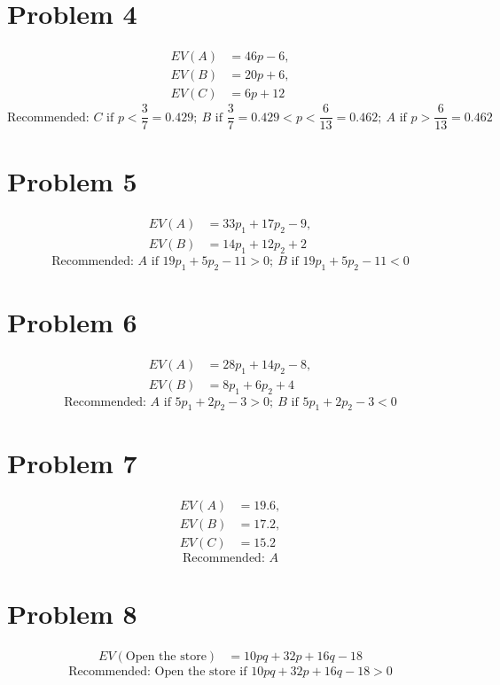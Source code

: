 \section*{Problem 4}
\[
\begin{aligned}
	EV(A) &= 46p-6,\\
	EV(B) &= 20p+6,\\
	EV(C) &= 6p+12
\end{aligned}
\]
\[
\text{Recommended: } C \text{ if } p<\frac{3}{7}=0.429;\ B \text{ if } \frac{3}{7}=0.429<p<\frac{6}{13}=0.462;\ A \text{ if } p>\frac{6}{13}=0.462
\]

\section*{Problem 5}
\[
\begin{aligned}
	EV(A) &= 33p_1+17p_2-9,\\
	EV(B) &= 14p_1+12p_2+2
\end{aligned}
\]
\[
\text{Recommended: } A \text{ if } 19p_1+5p_2-11>0;\ B \text{ if } 19p_1+5p_2-11<0
\]

\section*{Problem 6}
\[
\begin{aligned}
	EV(A) &= 28p_1+14p_2-8,\\
	EV(B) &= 8p_1+6p_2+4
\end{aligned}
\]
\[
\text{Recommended: } A \text{ if } 5p_1+2p_2-3>0;\ B \text{ if } 5p_1+2p_2-3<0
\]

\section*{Problem 7}
\[
\begin{aligned}
	EV(A) &= 19.6,\\
	EV(B) &= 17.2,\\
	EV(C) &= 15.2
\end{aligned}
\]
\[
\text{Recommended: } A
\]

\section*{Problem 8}
\[
\begin{aligned}
	EV(\text{Open the store}) &= 10pq+32p+16q-18
\end{aligned}
\]
\[
\text{Recommended: } \text{Open the store if } 10pq+32p+16q-18>0
\]

